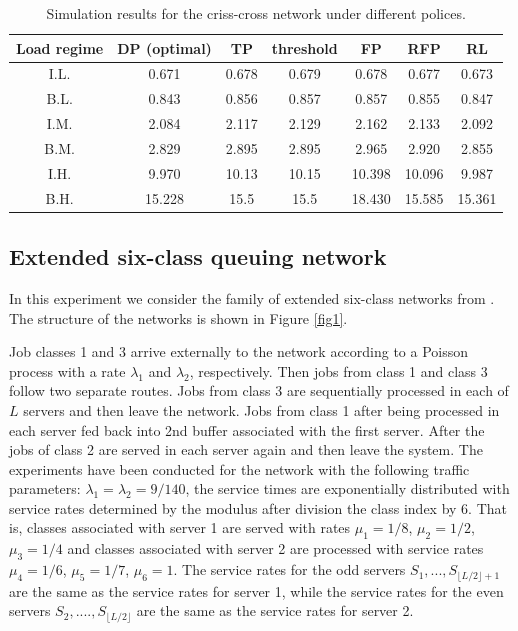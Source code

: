 \documentclass[11pt]{article}
\theoremstyle{definition}
\numberwithin{equation}{section}
\begin{document}
\begin{table}[H]
\centering
\begin{tabular}{|c|c|c|c|c|c|c|}
  \hline
  Load regime  & DP (optimal) & TP & threshold & FP & RFP &RL \\\hline
  I.L. & 0.671 & 0.678 & 0.679 & 0.678 &0.677&  0.673\\\hline
  B.L. & 0.843 & 0.856 & 0.857 & 0.857 &0.855& 0.847 \\\hline
  I.M. & 2.084 & 2.117 & 2.129 & 2.162 &2.133&  2.092\\\hline
  B.M. & 2.829 & 2.895 & 2.895 & 2.965 &2.920 & 2.855\\\hline
  I.H. & 9.970 & 10.13 & 10.15 & 10.398 &10.096 &9.987\\\hline
  B.H. & 15.228 & 15.5 & 15.5 & 18.430 &15.585&  15.361\\

  \hline


\end{tabular}

 \caption[]{Simulation results for the criss-cross network under different polices.}\label{tab:cc}%
\end{table}






\subsection{Extended six-class queuing network}\label{sec:ext}

In this experiment we consider the family of extended six-class networks from \cite{Bertsimas2015}. The structure of the networks is shown in Figure \ref{fig1}.

Job classes 1 and 3 arrive externally  to the network according to a Poisson process with a rate $\lambda_1$ and $\lambda_2$, respectively. Then jobs from class 1 and class 3 follow two separate routes. Jobs from class 3 are sequentially processed in each of $L$ servers and then leave the network.  Jobs from class 1 after being processed in each server fed back into 2nd buffer associated with the first server. After the jobs of class 2 are served in each server again and then leave the system. The experiments have been conducted for the network with the following traffic parameters: $\lambda_1 = \lambda_2 = 9/140$, the service times are exponentially distributed with service rates determined  by the modulus after division the class index  by 6. That is, classes associated with server 1 are served with rates $\mu_1 = 1/8$, $\mu_2 = 1/2$, $\mu_3 = 1/4$ and classes associated with server 2 are processed with service rates $\mu_4 = 1/6$, $\mu_5 = 1/7$, $\mu_6 = 1.$  The service rates
for the odd servers $S_1, ..., S_{\lfloor L/2\rfloor+1}$ are the same as the service rates for server 1, while the service rates for the even
servers $S_2, ...., S_{\lfloor L/2 \rfloor}$ are the same as the service rates for server 2.
\end{document}
